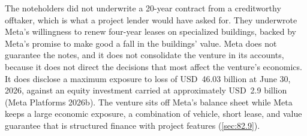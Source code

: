 The noteholders did not underwrite a 20-year contract from a creditworthy offtaker, which is what a project lender would have asked for. They underwrote Meta's willingness to renew four-year leases on specialized buildings, backed by Meta's promise to make good a fall in the buildings' value. Meta does not guarantee the notes, and it does not consolidate the venture in its accounts, because it does not direct the decisions that most affect the venture's economics. It does disclose a maximum exposure to loss of USD~46.03 billion at June 30, 2026, against an equity investment carried at approximately USD~2.9 billion (Meta Platforms 2026b). The venture sits off Meta's balance sheet while Meta keeps a large economic exposure, a combination of vehicle, short lease, and value guarantee that is structured finance with project features (\cref{sec:82.9}).

